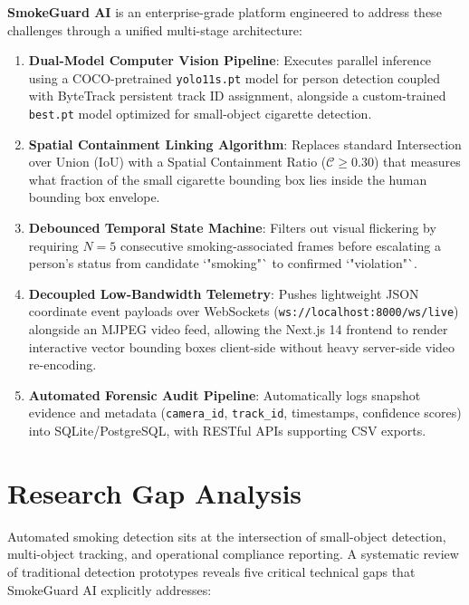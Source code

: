 \documentclass[11pt,a4paper]{article}
\begin{document}
\textbf{SmokeGuard AI} is an enterprise-grade platform engineered to address these challenges through a unified multi-stage architecture:
\begin{enumerate}[leftmargin=*]
    \item \textbf{Dual-Model Computer Vision Pipeline}: Executes parallel inference using a COCO-pretrained \texttt{yolo11s.pt} model for person detection coupled with ByteTrack persistent track ID assignment, alongside a custom-trained \texttt{best.pt} model optimized for small-object cigarette detection.
    \item \textbf{Spatial Containment Linking Algorithm}: Replaces standard Intersection over Union (IoU) with a Spatial Containment Ratio ($\mathcal{C} \ge 0.30$) that measures what fraction of the small cigarette bounding box lies inside the human bounding box envelope.
    \item \textbf{Debounced Temporal State Machine}: Filters out visual flickering by requiring $N=5$ consecutive smoking-associated frames before escalating a person's status from candidate `"smoking"` to confirmed `"violation"`.
    \item \textbf{Decoupled Low-Bandwidth Telemetry}: Pushes lightweight JSON coordinate event payloads over WebSockets (\texttt{ws://localhost:8000/ws/live}) alongside an MJPEG video feed, allowing the Next.js 14 frontend to render interactive vector bounding boxes client-side without heavy server-side video re-encoding.
    \item \textbf{Automated Forensic Audit Pipeline}: Automatically logs snapshot evidence and metadata (\texttt{camera\_id}, \texttt{track\_id}, timestamps, confidence scores) into SQLite/PostgreSQL, with RESTful APIs supporting CSV exports.
\end{enumerate}

\section{Research Gap Analysis}

Automated smoking detection sits at the intersection of small-object detection, multi-object tracking, and operational compliance reporting. A systematic review of traditional detection prototypes reveals five critical technical gaps that SmokeGuard AI explicitly addresses:
\end{document}
